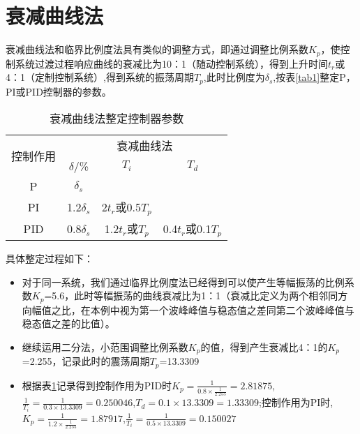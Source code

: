 \documentclass{WHUMaster}   %
\begin{document}
\section{衰减曲线法}
衰减曲线法和临界比例度法具有类似的调整方式，即通过调整比例系数$K_p$，使控制系统过渡过程响应曲线的衰减比为10：1（随动控制系统），得到上升时间$t_r$或4：1（定制控制系统）,得到系统的振荡周期$T_p$,此时比例度为$\delta _s$,按表\ref{tab1}整定P，PI或PID控制器的参数。

\begin{table}[htbp]
	\centering
	\caption{衰减曲线法整定控制器参数}
	\begin{tabular}{cc|cc|cc|cc}
		\toprule
		\multicolumn{2}{c|}{\multirow{2}[4]{*}{控制作用}} & \multicolumn{6}{c}{衰减曲线法} \\
		\cmidrule{3-8}    \multicolumn{2}{c|}{} & \multicolumn{2}{c|}{$\delta$/\%} & \multicolumn{2}{c|}{$T_i$} & \multicolumn{2}{c}{$T_d$} \\
		\midrule
		\multicolumn{2}{c|}{P} & \multicolumn{2}{c|}{$\delta _s$} & \multicolumn{2}{c|}{} & \multicolumn{2}{c}{} \\
		\multicolumn{2}{c|}{PI} & \multicolumn{2}{c|}{1.2$\delta _s$} & \multicolumn{2}{c|}{2$t_r$或0.5$T_p$} & \multicolumn{2}{c}{} \\
		\multicolumn{2}{c|}{PID} & \multicolumn{2}{c|}{0.8$\delta _s$} & \multicolumn{2}{c|}{1.2$t_r$或$T_p$} & \multicolumn{2}{c}{0.4$t_r$或0.1$T_p$} \\
		\bottomrule
	\end{tabular}%
	\label{tab2}%
\end{table}%
具体整定过程如下：
\begin{itemize}
	
\item 对于同一系统，我们通过临界比例度法已经得到可以使产生等幅振荡的比例系数$K_p$=5.6，此时等幅振荡的曲线衰减比为1：1（衰减比定义为两个相邻同方向幅值之比，在本例中视为第一个波峰峰值与稳态值之差同第二个波峰峰值与稳态值之差的比值）。
\item 继续运用二分法，小范围调整比例系数$K_p$的值，得到产生衰减比4：1的$K_p$=2.255，记录此时的震荡周期$T_p$=13.3309
\item 根据表\ref{tab2}记录得到控制作用为PID时$K_p=\frac{1}{0.8\times \frac{1}{2.255}}=2.81875$,$\frac{1}{T_i}=\frac{1}{0.3\times 13.3309}=0.250046$,$T_d=0.1\times 13.3309=1.33309$;控制作用为PI时,$K_p=\frac{1}{1.2\times \frac{1}{2.255}}=1.87917$,$\frac{1}{T_i}=\frac{1}{0.5\times 13.3309}=0.150027$
\end{itemize}
\end{document}
